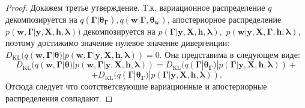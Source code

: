 \begin{proof}
Докажем третье утверждение. Т.к. вариационное распределение $q$ декомпозируется на $q(\boldsymbol{\Gamma}|\boldsymbol{\theta}_{\boldsymbol{\Gamma}}),  q(\mathbf{w}|\boldsymbol{\Gamma}, \boldsymbol{\theta}_{\mathbf{w}})$, апостериорное распределение $p(\mathbf{w}, \boldsymbol{\Gamma}|\mathbf{y}, \mathbf{X}, \mathbf{h}, \boldsymbol{\lambda}))$ декомпозируется на $p(\boldsymbol{\Gamma}|\mathbf{y}, \mathbf{X}, \mathbf{h}, \boldsymbol{\lambda}),$ $p(\mathbf{w}| \mathbf{y}, \mathbf{X}, \boldsymbol{\Gamma}, \mathbf{h}, \boldsymbol{\lambda})$, поэтому достижимо значение нулевое значение
дивергенции: ${D}_\text{KL}(q(\mathbf{w}, \boldsymbol{\Gamma}|\boldsymbol{\theta})|p(\mathbf{w}, \boldsymbol{\Gamma}|\mathbf{y}, \mathbf{X}, \mathbf{h}, \boldsymbol{\lambda})) = 0.$ Она представима в следующем виде:
\[
{D}_\text{KL}(q(\mathbf{w}, \boldsymbol{\Gamma}|\boldsymbol{\theta})|p(\mathbf{w}, \boldsymbol{\Gamma}|\mathbf{y}, \mathbf{X}, \mathbf{h}, \boldsymbol{\lambda})) = 
{D}_\text{KL}(q(\boldsymbol{\Gamma}|\boldsymbol{\theta}_{\boldsymbol{\Gamma}})|p(\boldsymbol{\Gamma}|\mathbf{y}, \mathbf{X}, \mathbf{h}, \boldsymbol{\lambda})) +
\]
\[+ {D}_\text{KL}(q(\boldsymbol{\Gamma}|\boldsymbol{\theta}_{\boldsymbol{\Gamma}})|p(\boldsymbol{\Gamma}|\mathbf{y}, \mathbf{X}, \mathbf{h}, \boldsymbol{\lambda})).
\]
Отсюда следует что соотстветсвующие вариационные и апостериорные распределения совпадают.
\end{proof}


